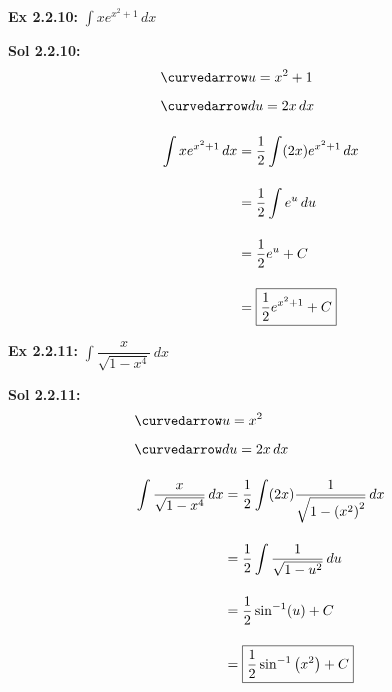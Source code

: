 \begin{tcolorbox}[example]
    \textbf{Ex 2.2.10: } $\int xe^{x^2 + 1} \, dx$
\end{tcolorbox}
\begin{tcolorbox}[solution]
    \textbf{Sol 2.2.10: } \begin{align*}
        & \curvedarrow u = x^2 + 1 \\[5.5pt]
        & \curvedarrow du = 2x \, dx \\[11pt]
        & \int xe^{x^2 + 1} \, dx \begin{aligned}[t]
            & = \dfrac{1}{2}\int (2x)e^{x^2 + 1} \, dx \\[11pt]
            & = \dfrac{1}{2}\int e^u \, du \\[11pt]
            & = \dfrac{1}{2}e^u + C \\[11pt]
            & = \boxed{\dfrac{1}{2}e^{x^2 + 1} + C}
        \end{aligned}
    \end{align*}
\end{tcolorbox} \vspace{11pt}

\begin{tcolorbox}[example]
    \textbf{Ex 2.2.11: } $\int \dfrac{x}{\sqrt{1 - x^4}} \, dx$
\end{tcolorbox}
\begin{tcolorbox}[solution]
    \textbf{Sol 2.2.11: } \begin{align*}
        & \curvedarrow u = x^2 \\[5.5pt]
        & \curvedarrow du = 2x \, dx \\[11pt]
        & \int \dfrac{x}{\sqrt{1 - x^4}} \, dx \begin{aligned}[t]
            & = \dfrac{1}{2}\int (2x)\dfrac{1}{\sqrt{1 - \left(x^2\right)^2}} \, dx \\[11pt]
            & = \dfrac{1}{2} \int \dfrac{1}{\sqrt{1 - u^2}} \, du \\[11pt]
            & = \dfrac{1}{2}\sin^{-1} (u) + C \\[11pt]
            & = \boxed{\dfrac{1}{2}\sin^{-1} \left(x^2\right) + C} 
        \end{aligned}
    \end{align*}
\end{tcolorbox} \vspace{11pt}

